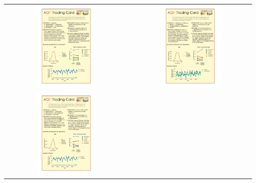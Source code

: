 \documentclass[10pt]{amsart}
\begin{document}
\noindent
\begin{tabular}[t]{c @{} c}	
\includegraphics[width=0.5\textwidth]{card_125bp_rare1250_rank224_Prevotella/otu_trading_card.pdf} &
\includegraphics[width=0.5\textwidth]{card_125bp_rare1250_rank783_Lactobacillus/otu_trading_card.pdf} \\
\includegraphics[width=0.5\textwidth]{card_125bp_rare1250_rank971_Prevotella/otu_trading_card.pdf} &

\end{tabular}
\end{document}
